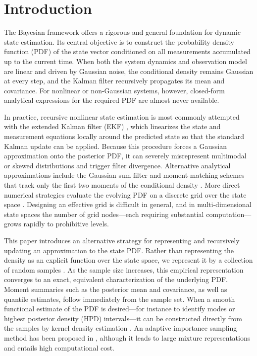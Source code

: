 \section{Introduction}\label{sec:intro}

The Bayesian framework offers a rigorous and general foundation for dynamic state estimation. Its central objective is to construct the probability density function (PDF) of the state vector conditioned on all measurements accumulated up to the current time. When both the system dynamics and observation model are linear and driven by Gaussian noise, the conditional density remains Gaussian at every step, and the Kalman filter recursively propagates its mean and covariance. For nonlinear or non-Gaussian systems, however, closed-form analytical expressions for the required PDF are almost never available.

In practice, recursive nonlinear state estimation is most commonly attempted with the extended Kalman filter (EKF) \cite{r01}, which linearizes the state and measurement equations locally around the predicted state so that the standard Kalman update can be applied. Because this procedure forces a Gaussian approximation onto the posterior PDF, it can severely misrepresent multimodal or skewed distributions and trigger filter divergence. Alternative analytical approximations include the Gaussian sum filter \cite{r02} and moment-matching schemes that track only the first two moments of the conditional density \cite{r03,r04}. More direct numerical strategies evaluate the evolving PDF on a discrete grid over the state space \cite{r05,r06,r07,r08,r09}. Designing an effective grid is difficult in general, and in multi-dimensional state spaces the number of grid nodes—each requiring substantial computation—grows rapidly to prohibitive levels.

This paper introduces an alternative strategy for representing and recursively updating an approximation to the state PDF. Rather than representing the density as an explicit function over the state space, we represent it by a collection of random samples \cite{r10,r11,r12}. As the sample size increases, this empirical representation converges to an exact, equivalent characterization of the underlying PDF. Moment summaries such as the posterior mean and covariance, as well as quantile estimates, follow immediately from the sample set. When a smooth functional estimate of the PDF is desired—for instance to identify modes or highest posterior density (HPD) intervals—it can be constructed directly from the samples by kernel density estimation \cite{r13}. An adaptive importance sampling method has been proposed in \cite{r11}, although it leads to large mixture representations and entails high computational cost.

